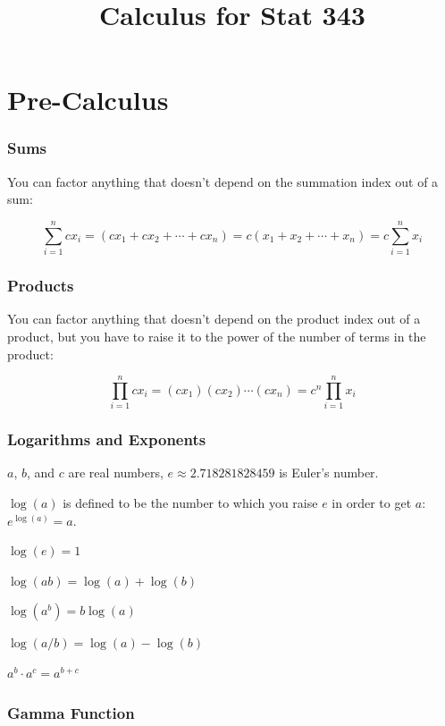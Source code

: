 \documentclass[]{article}
\title{Calculus for Stat 343}
\author{}
\date{}
\begin{document}
\maketitle

\section{Pre-Calculus}\label{pre-calculus}

\subsubsection{Sums}\label{sums}

You can factor anything that doesn't depend on the summation index out
of a sum:

\[\sum_{i = 1}^n c x_i = (c x_1 + c x_2 + \cdots + c x_n) = c(x_1 + x_2 + \cdots + x_n) = c \sum_{i = 1}^n x_i\]

\subsubsection{Products}\label{products}

You can factor anything that doesn't depend on the product index out of
a product, but you have to raise it to the power of the number of terms
in the product:

\[\prod_{i = 1}^n c x_i = (c x_1)(c x_2) \cdots (c x_n) = c^n \prod_{i = 1}^n x_i\]

\subsubsection{Logarithms and Exponents}\label{logarithms-and-exponents}

\(a\), \(b\), and \(c\) are real numbers, \(e \approx 2.718281828459\)
is Euler's number.

\(\log(a)\) is defined to be the number to which you raise \(e\) in
order to get \(a\): \(e^{\log(a)} = a\).

\(\log(e) = 1\)

\(\log(ab) = \log(a) + \log(b)\)

\(\log(a^b) = b \log(a)\)

\(\log(a/b) = \log(a) - \log(b)\)

\(a^b \cdot a^c = a^{b + c}\)

\subsubsection{Gamma Function}\label{gamma-function}
\end{document}
